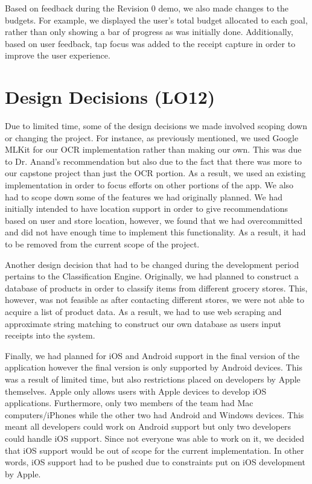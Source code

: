 \documentclass{article}
\begin{document}
Based on feedback during the Revision 0 demo, we also made changes to the budgets. For example, we  displayed the user's
total budget allocated to each goal, rather than only showing a bar of progress as was initially done. Additionally, based
on user feedback, tap focus was added to the receipt capture in order to improve the user experience.

\section{Design Decisions (LO12)}


Due to limited time, some of the design decisions we made involved scoping down or changing
the project. For instance, as previously mentioned, we used Google MLKit for our OCR implementation
rather than making our own. This was due to Dr. Anand's recommendation but also due to the fact that
there was more to our capstone project than just the OCR portion. As a result, we used an existing implementation
in order to focus efforts on other portions of the app. We also had to scope down some of the features we
had originally planned. We had initially intended to have location support in order to give recommendations
based on user and store location, however, we found that we had overcommitted and did not have enough time to
implement this functionality. As a result, it had to be removed from the current scope of the project.

Another design decision that had to be changed during the development period pertains to the Classification
Engine. Originally, we had planned to construct a database of products in order to classify items from different
grocery stores. This, however, was not feasible as after contacting different stores, we were not able to acquire
a list of product data. As a result, we had to use web scraping and approximate string matching to construct our own database
as users input receipts into the system.

Finally, we had planned for iOS and Android support in the final version of the application however the final version
is only supported by Android devices. This was a result of limited time, but also restrictions placed on developers
by Apple themselves. Apple only allows users with Apple devices to develop iOS applications. Furthermore, only two members of the
team had Mac computers/iPhones while the other two had Android and
Windows devices. This meant all developers could work on Android support but only two developers could handle iOS
support. Since not everyone was able to work on it, we decided that iOS support would be out of scope for the current
implementation. In other words, iOS support had to be pushed due to constraints put on iOS development by Apple.
\end{document}
